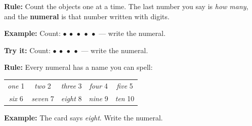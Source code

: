 \documentclass[12pt]{article}
\begin{document}


\begin{formulabox}
\textbf{Rule:} Count the objects one at a time. The last number you say is
\emph{how many}, and the \textbf{numeral} is that number written with digits.
\end{formulabox}

\begin{examplebox}
\textbf{Example:} \quad Count: $\bullet\ \bullet\ \bullet\ \bullet\ \bullet$
--- write the numeral.
\end{examplebox}

\begin{tryitbox}
\textbf{Try it:} \quad Count: $\bullet\ \bullet\ \bullet\ \bullet$ --- write
the numeral.\\[2pt]
\end{tryitbox}


\begin{formulabox}
\textbf{Rule:} Every numeral has a name you can spell:\par
\begin{center}\small
\begin{tabular}{ccccc}
\emph{one} 1 & \emph{two} 2 & \emph{three} 3 & \emph{four} 4 & \emph{five} 5\\
\emph{six} 6 & \emph{seven} 7 & \emph{eight} 8 & \emph{nine} 9 & \emph{ten} 10\\
\end{tabular}\end{center}
\end{formulabox}

\begin{examplebox}
\textbf{Example:} \quad The card says \emph{eight}. Write the numeral.
\end{examplebox}
\end{document}
